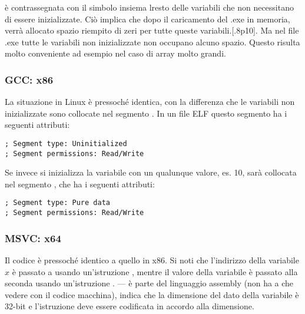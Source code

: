  è contrassegnata con il simbolo  insiema lresto delle variabili che non necessitano di essere inizializzate.
Ciò implica che dopo il caricamento del .exe in memoria, verrà allocato spazio riempito di zeri per tutte queste variabili.[.8p10].
Ma nel file .exe tutte le variabili non inizializzate non occupano alcuno spazio.
Questo risulta molto conveniente ad esempio nel caso di array molto grandi.



\subsubsection{GCC: x86}

La situazione in Linux è pressoché identica, con la differenza che le variabili non inizializzate sono collocate nel segmento . 
In un file \ac{ELF} questo segmento ha i seguenti attributi:

\begin{lstlisting}
; Segment type: Uninitialized
; Segment permissions: Read/Write
\end{lstlisting}

Se invece si inizializza la variabile con un qualunque valore, es. 10, 
sarà collocata nel segmento , che ha i seguenti attributi:

\begin{lstlisting}
; Segment type: Pure data
; Segment permissions: Read/Write
\end{lstlisting}

\subsubsection{MSVC: x64}



Il codice è pressoché identico a quello in x86.
Si noti che l'indirizzo della variabile $x$ è passato a  usando un'istruzione \LEA ,
mentre il valore della variabile è passato alla seconda \printf usando un'istruzione \MOV.
--- è parte del linguaggio assembly (non ha a che vedere con il codice macchina),
indica che la dimensione del dato della variabile è 32-bit e l'istruzione \MOV deve essere codificata in accordo alla dimensione.

